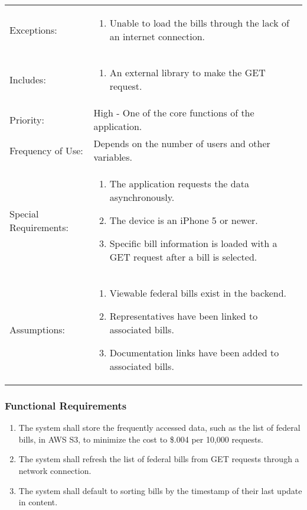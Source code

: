 \documentclass{beamer}
\begin{document}
  \begin{frame}
    \begin{tabu}{lX}
Exceptions:&
\begin{enumerate}
\item Unable to load the bills through the lack of an internet connection.
\end{enumerate}\\
Includes:&
\begin{enumerate}
\item An external library to make the GET request.
\end{enumerate}\\
Priority:&High - One of the core functions of the application.\\
Frequency of Use:&Depends on the number of users and other variables.\\
Special Requirements:&
\begin{enumerate}
\item The application requests the data asynchronously.
\item The device is an iPhone 5 or newer.
\item Specific bill information is loaded with a GET request after a bill is selected.
\end{enumerate}\\
Assumptions:&
\begin{enumerate}
\item Viewable federal bills exist in the backend.
\item Representatives have been linked to associated bills.
\item Documentation links have been added to associated bills.
\end{enumerate}
\end{tabu}
\end{frame}

\begin{frame}
  \frametitle{Functional Requirements}
  \begin{enumerate}
    \item The system shall store the frequently accessed data, such as the list of federal bills, in AWS S3, to minimize the cost to \$.004 per 10,000 requests.
    \item The system shall refresh the list of federal bills from GET requests through a network connection.
    \item The system shall default to sorting bills by the timestamp of their last update in content.
  \end{enumerate}
\end{frame}
\end{document}
